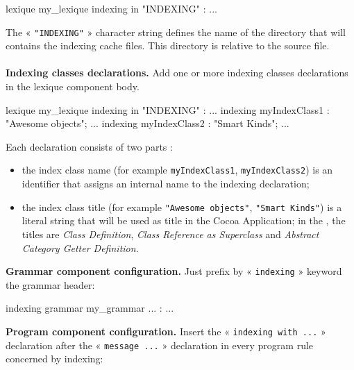 \begin{galgascode}
lexique my_lexique indexing in "INDEXING" :
  ...
\end{galgascode}

The « \texttt{"INDEXING"} » character string defines the name of the directory that will contains the indexing cache files. This directory is relative to the source file.
 \\
 \\
 \textbf{Indexing classes declarations.} Add one or more indexing classes declarations in the lexique component body.


\begin{galgascode}
lexique my_lexique indexing in "INDEXING" :
  ...
indexing myIndexClass1 : "Awesome objects";
  ...
indexing myIndexClass2 : "Smart Kinds";
  ...
\end{galgascode}

Each declaration consists of two parts :
\begin{itemize}
\item the index class name (for example \texttt{myIndexClass1}, \texttt{myIndexClass2}) is an identifier that assigns an internal name to the indexing declaration;
\item the index class title (for example \texttt{"Awesome objects"}, \texttt{"Smart Kinds"}) is a literal string that will be used as title in the Cocoa Application; in the , the titles are \emph{Class Definition}, \emph{Class Reference as Superclass} and \emph{Abstract Category Getter Definition}.
\end{itemize}

\noindent{} \textbf{Grammar component configuration.} Just prefix by « \texttt{indexing} » keyword the grammar header:

\begin{galgascode}
indexing grammar my_grammar ... :
  ...
\end{galgascode}



\noindent{} \textbf{Program component configuration.} Insert the « \texttt{indexing with ...} » declaration after the « \texttt{message ...} » declaration in every program rule concerned by indexing:

\begin{galgascode}
  ...
when ...
message ...
indexing with my_grammar
??@lstring inSourceFile {
  ...
\end{galgascode}






